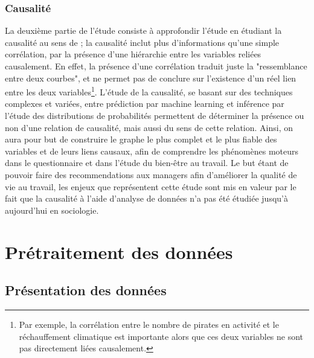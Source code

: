\documentclass[11pt,fleqn,openany,frenchb]{book} %
\begin{document}
\subsection{Causalité}
La deuxième partie de l'étude consiste à approfondir l'étude en étudiant la causalité au sens de \cite{granger1969causality} ; la causalité inclut plus d'informations qu'une simple corrélation, par la présence d'une hiérarchie entre les variables reliées causalement. En effet, la présence d'une corrélation traduit juste la "ressemblance entre deux courbes", et ne permet pas de conclure sur l'existence d'un réel lien entre les deux variables\footnote{Par exemple, la corrélation entre le nombre de pirates en activité et le réchauffement climatique est importante alors que ces deux variables ne sont pas directement liées causalement.}. L'étude de la causalité, se basant sur des techniques complexes et variées, entre prédiction par machine learning et inférence par l'étude des distributions de probabilités permettent de déterminer la présence ou non d'une relation de causalité, mais aussi du sens de cette relation. Ainsi, on aura pour but de construire le graphe le plus complet et le plus fiable des variables et de leurs liens causaux, afin de comprendre les phénomènes moteurs dans le questionnaire et dans l'étude du bien-être au travail. Le but étant de pouvoir faire des recommendations aux managers afin d'améliorer la qualité de vie au travail, les enjeux que représentent cette étude sont mis en valeur par le fait que la causalité à l'aide d'analyse de données n'a pas été étudiée jusqu'à aujourd'hui en sociologie. \par %

\chapter{Prétraitement des données}
\section{Présentation des données}
\end{document}
